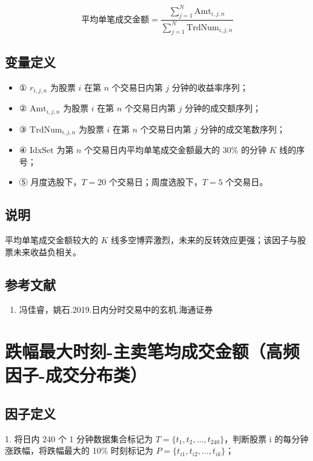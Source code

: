 \documentclass{article}
\begin{document}
\begin{equation}
    \text{平均单笔成交金额} = \frac{\sum_{j=1}^{N} \mathrm{Amt}_{i,j,n}}{\sum_{j=1}^{N} \mathrm{TrdNum}_{i,j,n}}
\end{equation}

\subsection{变量定义}
\begin{itemize}
    \item ① \( r_{i,j,n} \) 为股票 \( i \) 在第 \( n \) 个交易日内第 \( j \) 分钟的收益率序列；
    \item ② \( \mathrm{Amt}_{i,j,n} \) 为股票 \( i \) 在第 \( n \) 个交易日内第 \( j \) 分钟的成交额序列；
    \item ③ \( \mathrm{TrdNum}_{i,j,n} \) 为股票 \( i \) 在第 \( n \) 个交易日内第 \( j \) 分钟的成交笔数序列；
    \item ④ \( \mathrm{IdxSet} \) 为第 \( n \) 个交易日内平均单笔成交金额最大的 30\% 的分钟 \( K \) 线的序号；
    \item ⑤ 月度选股下，\( T=20 \) 个交易日；周度选股下，\( T=5 \) 个交易日。
\end{itemize}

\subsection{说明}
平均单笔成交金额较大的 \( K \) 线多空博弈激烈，未来的反转效应更强；该因子与股票未来收益负相关。

\subsection{参考文献}
\begin{enumerate}
    \item 冯佳睿，姚石.2019.日内分时交易中的玄机.海通证券
\end{enumerate}

\section{跌幅最大时刻-主卖笔均成交金额（高频因子-成交分布类）}

\subsection{因子定义}


1. 将日内 240 个 1 分钟数据集合标记为 \( T = \{t_1, t_2, \dots, t_{240}\} \)，判断股票 i 的每分钟涨跌幅，将跌幅最大的 10\% 时刻标记为 \( P = \{t_{i1}, t_{i2}, \dots, t_{ik}\} \)；
\end{document}
